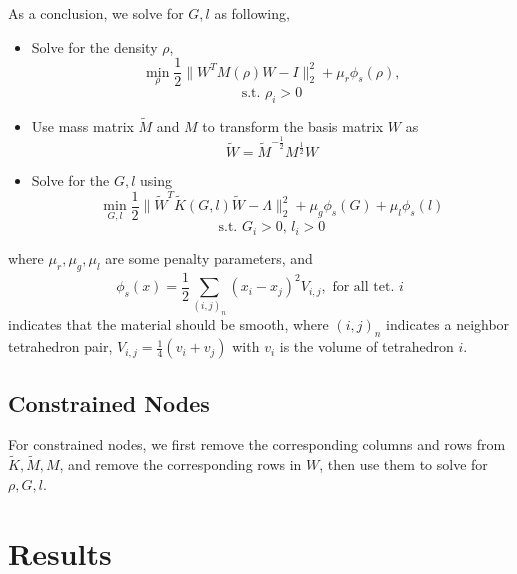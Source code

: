 \documentclass[9pt,twocolumn]{extarticle}
\begin{document}
As a conclusion, we solve for $G,l$ as following,
\begin{itemize}
\item Solve for the density $\rho$,
  \begin{equation} \label{rho}
    \min_{\rho}\frac{1}{2}\|W^TM(\rho)W-I\|_2^2+\mu_{r}\phi_s(\rho), 
  \end{equation}
  \[
  \mbox{s.t. } \rho_i>0
  \]
\item Use mass matrix $\tilde{M}$ and $M$ to transform the basis matrix $W$ as
  \begin{equation} \label{W_ext}
    \tilde{W}=\tilde{M}^{-\frac{1}{2}}M^{\frac{1}{2}}W
  \end{equation}
\item Solve for the $G,l$ using
\begin{equation} \label{gl}
  \min_{G,l}\frac{1}{2}\|\tilde{W}^T\tilde{K}(G,l)\tilde{W}-\Lambda\|_2^2+\mu_{g}\phi_s(G)+\mu_{l}\phi_s(l)
\end{equation}
  \[
  \mbox{s.t. }  G_i>0 \mbox{, } l_i>0
  \]
\end{itemize}
where $\mu_r, \mu_g, \mu_l$ are some penalty parameters, and
\begin{equation} \label{smooth}
  \phi_s(x) = \frac{1}{2}\sum_{(i,j)_{n}}(x_i-x_j)^2V_{i,j}, \mbox{ for all
    tet. }i
\end{equation}
indicates that the material should be smooth, where $(i,j)_{n}$ indicates a
neighbor tetrahedron pair, $V_{i,j}=\frac{1}{4}(v_i+v_j)$ with $v_i$ is the
volume of tetrahedron $i$.

\subsection{Constrained Nodes}
For constrained nodes, we first remove the corresponding columns and rows from
$\tilde{K}, \tilde{M}, M$, and remove the corresponding rows in $W$, then use
them to solve for $\rho,G,l$.

\section{Results}
\end{document}
